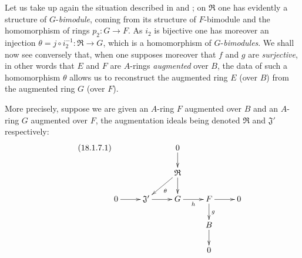 \begin{env}[18.1.7]
\label{0.18.1.7}
Let us take up again the situation described in  and ; on $\mathfrak{R}$ one has evidently a structure of $G$-\emph{bimodule}, coming from its structure of $F$-bimodule and the homomorphism of rings $p_2:G\to F$.
As $i_2$ is bijective one has moreover an injection $\theta=j\circ i_2^{-1}:\mathfrak{R}\to G$, which is a homomorphism of $G$-\emph{bimodules}.
We shall now see conversely that, when one supposes moreover that $f$ and $g$ are \emph{surjective}, in other words that $E$ and $F$ are $A$-rings \emph{augmented} over $B$, the data of such a homomorphism $\theta$ allows us to reconstruct the augmented ring $E$ (over $B$) from the augmented ring $G$ (over $F$).

More precisely, suppose we are given an $A$-ring $F$ augmented over $B$ and an $A$-ring $G$ augmented over $F$, the augmentation ideals being denoted $\mathfrak{R}$ and $\mathfrak{J}'$ respectively:
\begin{equation}
\tag{18.1.7.1}
  \label{0.18.1.7.1}
  \xymatrix@C=2pc@R=1.5pc{
    & & 0\ar[d] & & \\
    & & \mathfrak{R}\ar[ld]^\theta\ar[d] & & \\
    0\ar[r] & \mathfrak{J}'\ar[r] & G\ar[r]_h & F\ar[r]\ar[d]^g & 0\\
    & & & B\ar[d] & \\
    & & & 0 &
  }
\end{equation}


\end{env}
